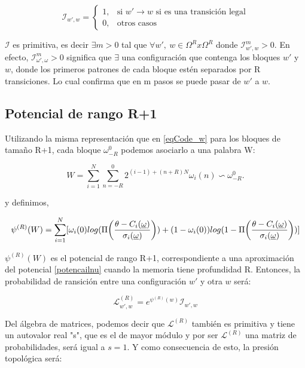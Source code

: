 \begin{equation}
    \mathcal{I}_{w',w}  = \left\{ \begin{array}{ll}
                            1, & \text{si } w' \rightarrow w \text{ si es una transición legal} \\ 
                            0,           & \text{otros casos}
                            \end{array}\right.
\end{equation}

$\mathcal{I}$ es primitiva, es decir $\exists m > 0$ tal que $\forall w',~w \in \Omega^R x \Omega^R$ donde $\mathcal{I}^m_{w',w}>0$.
En efecto, $\mathcal{I}^m_{\omega',\omega}>0$ significa que $\exists$ una configuración que contenga los bloques $w'$ y $w$, donde los primeros patrones de cada bloque estén separados por R transiciones. Lo cual confirma que en m pasos se puede pasar de $w'$ a $w$.

\subsection{Potencial de rango R+1}

Utilizando la misma representación que en \eqref{eqCode_w} para los bloques de tamaño R+1, cada bloque  $\omega^0_{-R}$ podemos asociarlo a una palabra W:

\begin{equation}
    W=\sum_{i=1}^N \sum_{n=-R}^{0} 2^{(i-1)+(n+R)N} \omega_i (n) \backsim \omega^0_{-R} .
    \label{configuraciones_W}
\end{equation}

y definimos,

\begin{equation*}
    \psi^{(R)}(W) = \sum^N_{i=1} [ \omega_i(0) log( \Pi\!\left(\frac{\theta-C_i(\underline{\omega})}{\sigma_i(\underline{\omega})}\right) ) + (1-\omega_i(0)) log(1-\Pi\!\left(\frac{\theta-C_i(\underline{\omega})}{\sigma_i(\underline{\omega})}\right))]
\end{equation*}

$\psi^{(R)}(W)$ es el potencial de rango R+1, correspondiente a una aproximación del potencial \eqref{potencailnu} cuando la memoria tiene profundidad R. 
Entonces, la probabilidad de ransición entre una configuración $w'$ y otra $w$ será:

\begin{equation*}
    \mathcal{L}^{(R)}_{w',w}= e^{ \psi^{(R)}(w)} \mathcal{I}_{w',w}
\end{equation*}

Del álgebra de matrices, podemos decir que $\mathcal{L}^{(R)}$ también es primitiva y tiene un autovalor real "s", que es el de mayor módulo y por ser $\mathcal{L}^{(R)}$ una matriz de probabilidades, será igual a $s=1$.
Y como consecuencia de esto, la presión topológica será:

